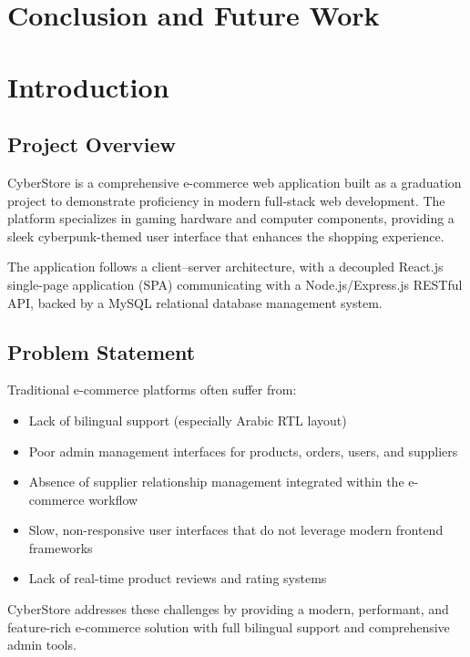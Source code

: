 \documentclass[12pt,a4paper]{report}
\begin{document}
\chapter*{Conclusion and Future Work}

\chapter{Introduction}

\section{Project Overview}
CyberStore is a comprehensive e-commerce web application built as a graduation project to demonstrate proficiency in modern full-stack web development. The platform specializes in gaming hardware and computer components, providing a sleek cyberpunk-themed user interface that enhances the shopping experience.

The application follows a client--server architecture, with a decoupled React.js single-page application (SPA) communicating with a Node.js/Express.js RESTful API, backed by a MySQL relational database management system.

\section{Problem Statement}
Traditional e-commerce platforms often suffer from:
\begin{itemize}[noitemsep]
  \item Lack of bilingual support (especially Arabic RTL layout)
  \item Poor admin management interfaces for products, orders, users, and suppliers
  \item Absence of supplier relationship management integrated within the e-commerce workflow
  \item Slow, non-responsive user interfaces that do not leverage modern frontend frameworks
  \item Lack of real-time product reviews and rating systems
\end{itemize}

CyberStore addresses these challenges by providing a modern, performant, and feature-rich e-commerce solution with full bilingual support and comprehensive admin tools.
\end{document}
